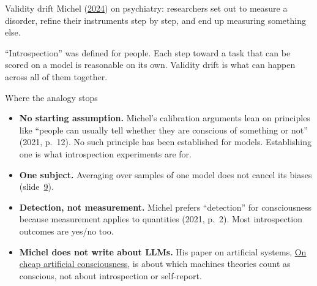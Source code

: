\documentclass[aspectratio=169,11pt]{beamer}
\begin{document}
\begin{frame}[label=drift]{Validity drift}
Michel (\href{https://580d4178-4a2a-40ee-b753-91905f0859e6.filesusr.com/ugd/b898ea_5e898d22d16b4ba89c07c379485770ed.pdf}{2024}) on psychiatry: researchers set out to measure a disorder, refine their instruments step by step, and end up measuring something else.

\vspace{0.6em}
\begin{center}
\end{center}

\vspace{0.5em}
{\small ``Introspection'' was defined for people. Each step toward a task that can be scored on a model is reasonable on its own. Validity drift is what can happen across all of them together.}
\end{frame}

\begin{frame}[label=limits]{Where the analogy stops}
\begin{itemize}\setlength\itemsep{8pt}
  \item {\small \textbf{No starting assumption.} Michel's calibration arguments lean on principles like ``people can usually tell whether they are conscious of something or not'' (2021, p.~12). No such principle has been established for models. Establishing one is what introspection experiments are for.}
  \item {\small \textbf{One subject.} Averaging over samples of one model does not cancel its biases (slide~\hyperlink{averaging}{9}).}
  \item {\small \textbf{Detection, not measurement.} Michel prefers ``detection'' for consciousness because measurement applies to quantities (2021, p.~2). Most introspection outcomes are yes/no too.}
  \item {\small \textbf{Michel does not write about LLMs.} His paper on artificial systems, \href{https://philpapers.org/archive/MICOCA-3.pdf}{On cheap artificial consciousness}, is about which machines theories count as conscious, not about introspection or self-report.}
\end{itemize}
\end{frame}
\end{document}
